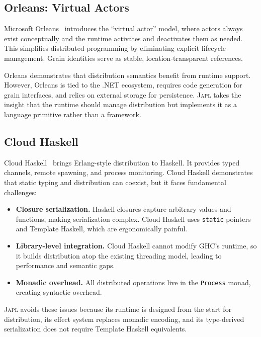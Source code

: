 \documentclass[11pt,a4paper]{article}
\newcommand{\japl}{\textsc{Japl}}
\begin{document}
\subsection{Orleans: Virtual Actors}

Microsoft Orleans~\citep{bernstein2014orleans,bykov2011orleans} introduces
the ``virtual actor'' model, where actors always exist conceptually and the
runtime activates and deactivates them as needed. This simplifies distributed
programming by eliminating explicit lifecycle management. Grain identities
serve as stable, location-transparent references.

Orleans demonstrates that distribution semantics benefit from runtime support.
However, Orleans is tied to the .NET ecosystem, requires code generation for
grain interfaces, and relies on external storage for persistence. \japl{}
takes the insight that the runtime should manage distribution but implements
it as a language primitive rather than a framework.

\subsection{Cloud Haskell}

Cloud Haskell~\citep{epstein2011towards} brings Erlang-style distribution to
Haskell. It provides typed channels, remote spawning, and process monitoring.
Cloud Haskell demonstrates that static typing and distribution can coexist,
but it faces fundamental challenges:

\begin{itemize}[nosep]
  \item \textbf{Closure serialization.} Haskell closures capture arbitrary
        values and functions, making serialization complex. Cloud Haskell
        uses \texttt{static} pointers and Template Haskell, which are
        ergonomically painful.
  \item \textbf{Library-level integration.} Cloud Haskell cannot modify
        GHC's runtime, so it builds distribution atop the existing threading
        model, leading to performance and semantic gaps.
  \item \textbf{Monadic overhead.} All distributed operations live in the
        \texttt{Process} monad, creating syntactic overhead.
\end{itemize}

\japl{} avoids these issues because its runtime is designed from the start
for distribution, its effect system replaces monadic encoding, and its
type-derived serialization does not require Template Haskell equivalents.
\end{document}
